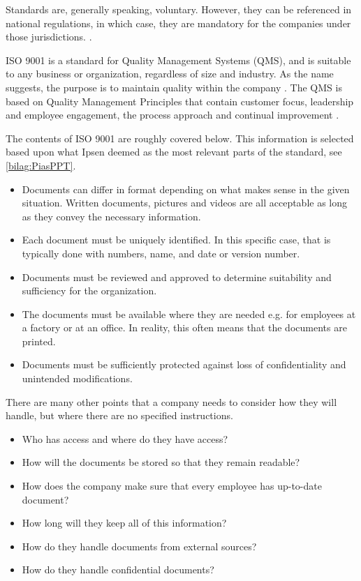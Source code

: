 Standards are, generally speaking, voluntary.
However, they can be referenced in national regulations, in which case, they are mandatory for the companies under those jurisdictions. \cite{ISOreviewedevery5years}.

ISO 9001 is a standard for Quality Management Systems (QMS), and is suitable to any business or organization, regardless of size and industry.
As the name suggests, the purpose is to maintain quality within the company \cite{ISO9001}.
The QMS is based on Quality Management Principles that contain customer focus, leadership and employee engagement, the process approach and continual improvement \cite{ISO9001-2}.

The contents of ISO 9001 are roughly covered below.
This information is selected based upon what Ipsen deemed as the most relevant parts of the standard, see \cref{bilag:PiasPPT}.

\begin{itemize}
	\item
	Documents can differ in format depending on what makes sense in the given situation. 
	Written documents, pictures and videos are all acceptable as long as they convey the necessary information.
	\item
	Each document must be uniquely identified.
	In this specific case, that is typically done with numbers, name, and date or version number.
	\item
	Documents must be reviewed and approved to determine suitability and sufficiency for the organization.
	\item
	The documents must be available where they are needed e.g. for employees at a factory or at an office.
	In reality, this often means that the documents are printed.
	\item
	Documents must be sufficiently protected against loss of confidentiality and unintended modifications.
\end{itemize}

There are many other points that a company needs to consider how they will handle, but where there are no specified instructions.

\begin{itemize}
	\item Who has access and where do they have access?
	\item How will the documents be stored so that they remain readable?
	\item How does the company make sure that every employee has up-to-date document?
	\item How long will they keep all of this information?
	\item How do they handle documents from external sources?
	\item How do they handle confidential documents?
\end{itemize}

